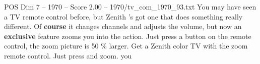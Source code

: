 \begin{textsample}{POS Dim 7 – 1970 – Score 2.00 – 1970/tv\_com\_1970\_93.txt}  \label{ex:f7_pos_032}
You may have seen a TV remote control before, but Zenith 's got one that does something really different.
Of \textbf{course} it changes channels and adjusts the volume, but now an \textbf{exclusive} feature zooms you into the action.
Just press a button on the remote control, the zoom picture is 50 \% larger.
Get a Zenith color TV with the zoom remote control.
Just press and zoom. you

\end{textsample}
